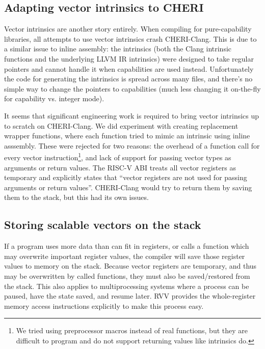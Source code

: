\documentclass[../thesis]{subfiles}
\begin{document}
\subsection{Adapting vector intrinsics to CHERI}
Vector intrinsics are another story entirely.
When compiling for pure-capability libraries, all attempts to use vector intrinsics crash CHERI-Clang.
This is due to a similar issue to inline assembly: the intrinsics (both the Clang intrinsic functions and the underlying LLVM IR intrinsics) were designed to take regular pointers and cannot handle it when capabilities are used instead.
Unfortunately the code for generating the intrinsics is spread across many files, and there's no simple way to change the pointers to capabilities (much less changing it on-the-fly for capability vs. integer mode).

It seems that significant engineering work is required to bring vector intrinsics up to scratch on CHERI-Clang.
We did experiment with creating replacement wrapper functions, where each function tried to mimic an intrinsic using inline asssembly.
These were rejected for two reasons: the overhead of a function call for every vector instruction\footnote{We tried using preprocessor macros instead of real functions, but they are difficult to program and do not support returning values like intrinsics do.}, and lack of support for passing vector types as arguments or return values.
The RISC-V ABI treats all vector registers as temporary and explicitly states that \enquote{vector registers are not used for passing arguments or return values}\cite{specification-RISCV-ABI-v1.0rc2}.
CHERI-Clang would try to return them by saving them to the stack, but this had its own issues.


\subsection{Storing scalable vectors on the stack}
If a program uses more data than can fit in registers, or calls a function which may overwrite important register values, the compiler will save those register values to memory on the stack.
Because vector registers are temporary, and thus may be overwritten by called functions, they must also be saved/restored from the stack.
This also applies to multiprocessing systems where a process can be paused, have the state saved, and resume later.
RVV provides the whole-register memory access instructions explicitly to make this process easy\cite[Section 7.9]{specification-RVV-v1.0}.
\end{document}
